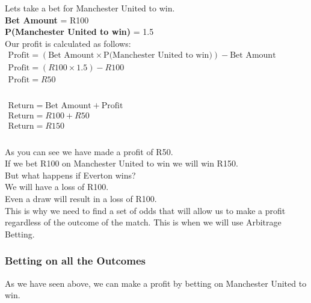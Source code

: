 Lets take a bet for Manchester United to win. \\

\textbf{Bet Amount} = R100 \\
\textbf{P(Manchester United to win)} = 1.5 \\

Our profit is calculated as follows: \\

\begin{math}
\begin{array}{l}
\text{Profit} = (\text{Bet Amount} \times \text{P(Manchester United to win)}) - \text{Bet Amount} \\
\text{Profit} = (R100 \times 1.5) - R100 \\
\text{Profit} = R50 \\
\\
\end{array}
\end{math}

\begin{math}
\begin{array}{l}
\text{Return} = \text{Bet Amount} + \text{Profit} \\
\text{Return} = R100 + R50 \\
\text{Return} = R150 \\
\\
\end{array}
\end{math}

As you can see we have made a profit of R50. \\
If we bet R100 on Manchester United to win we will win R150. \\

But what happens if Everton wins? \\
We will have a loss of R100. \\

Even a draw will result in a loss of R100. \\

This is why we need to find a set of odds that will allow us to make a profit regardless of the outcome of the match. This is when we will use Arbitrage Betting. \\

\subsubsection{Betting on all the Outcomes}

As we have seen above, we can make a profit by betting on Manchester United to win. \\

